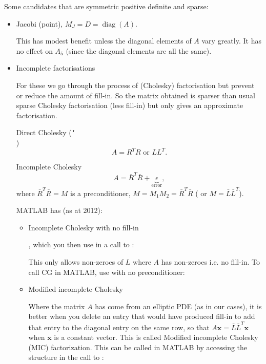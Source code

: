 \documentclass[12pt, a4paper]{article}
\renewcommand{\vec}[1]{\mathbf{#1}}
\theoremstyle{definition}
\theoremstyle{remark}
\numberwithin{equation}{section}
\newcommand\bslash{\char`\\}
\begin{document}
Some candidates that are symmetric positive definite and sparse:
\begin{itemize}
\item Jacobi (point), $M_J = D = \operatorname{diag}(A)$.

This has modest benefit unless the diagonal elements of $A$ vary greatly.  It has no effect on $A_5$ (since the diagonal elements are all the same).

\item Incomplete factorisations

For these we go through the process of (Cholesky) factorisation but prevent or reduce the amount of fill-in.
So the matrix obtained is sparser than usual sparse Cholesky factorisation (less fill-in) but only gives an approximate factorisation.

Direct Cholesky (\texttt{\bslash})
\begin{equation*}
A=R^TR \mbox{ or } L L^T.
\end{equation*}

Incomplete Cholesky
\begin{equation*}
A= \bar{R}^T \bar{R} + \underbrace{\epsilon}_{\mbox{error}},
\end{equation*}
where $\bar{R}^T\bar{R}=M$ is  a preconditioner, $M=M_1M_2=\bar{R}^T\bar{R}$ ( or $M = \bar{L}\bar{L}^T$).

MATLAB has (as at 2012):
\begin{itemize}
\item Incomplete Cholesky with no fill-in 

, which you then use in a call to :


This only allows non-zeroes of $L$ where $A$ has non-zeroes i.e. no fill-in.
To call CG in MATLAB, use  with no preconditioner:


\item Modified incomplete Cholesky

Where the matrix $A$ has come from an elliptic PDE (as in our cases), it is better when you delete an entry that would  have produced fill-in 
to add that entry to the diagonal entry on the same row, so that $A\vec{x} = \bar{L}\bar{L}^T\vec{x}$ when $\vec{x}$ is a constant vector. This is called 
Modified incomplete Cholesky (MIC) factorization. This can be called in MATLAB by accessing the  structure in the call to :


\end{itemize}
\end{itemize}
\end{document}
